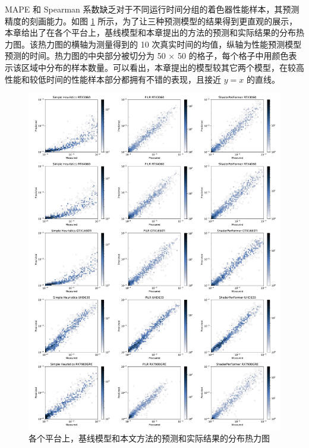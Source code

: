 MAPE 和 Spearman 系数缺乏对于不同运行时间分组的着色器性能样本，其预测精度的刻画能力。如图 \ref{fig:archHeatmap} 所示，为了让三种预测模型的结果得到更直观的展示，{\amend 本章}给出了在各个平台上，基线模型和{\amend 本章提出的}方法的预测和实际结果的分布热力图。该热力图的横轴为测量得到的 10 次真实时间的均值，纵轴为性能预测模型预测的时间。热力图的中央部分被切分为 50 $\times$ 50 的格子，每个格子中用颜色表示该区域中分布的样本数量。可以看出，{\amend 本章提出的}模型较其它两个模型，在较高性能和较低时间的性能样本部分都拥有不错的表现，且接近 $y=x$ 的直线。

\begin{figure}[htbp]
  \centering
  \includegraphics[width=1.0\linewidth]{figures/archHeatmapRefined.pdf}
  \caption{各个平台上，基线模型和本文方法的预测和实际结果的分布热力图}
  \label{fig:archHeatmap}
\end{figure}

